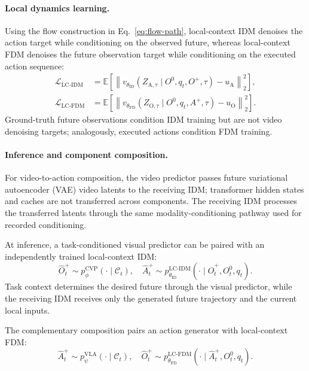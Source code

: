 \paragraph{Local dynamics learning.}
Using the flow construction in Eq.~\ref{eq:flow-path}, local-context IDM denoises
the action target while conditioning on the observed future, whereas local-context
FDM denoises the future observation target while conditioning on the
executed action sequence:
\begin{equation}
\begin{aligned}
\mathcal L_{\mathrm{LC\text{-}IDM}}
&=
\mathbb E\!\left[
\left\|
v_{\theta_{\mathrm{ID}}}
(
Z_{\mathrm A,\tau}
\mid
 O^0,q_t, O^+,\tau
)
-u_{\mathrm A}
\right\|_2^2
\right],\\
\mathcal L_{\mathrm{LC\text{-}FDM}}
&=
\mathbb E\!\left[
\left\|
v_{\theta_{\mathrm{FD}}}
(
Z_{\mathrm O,\tau}
\mid
 O^0,q_t, A^+,\tau
)
-u_{\mathrm O}
\right\|_2^2
\right].
\end{aligned}
\label{eq:strict-dynamics-objectives}
\end{equation}
Ground-truth future observations condition IDM training but are not video
denoising targets; analogously, executed actions condition FDM training.

\paragraph{Inference and component composition.}

For video-to-action composition, the video predictor passes future
variational autoencoder (VAE) video latents to the receiving IDM;
transformer hidden states and caches are not transferred across components.
The receiving IDM processes the transferred latents through the same
modality-conditioning pathway used for recorded conditioning.

At inference, a task-conditioned visual predictor can be paired with an
independently trained local-context IDM:
\begin{equation}
\hat{O}_t^+ \sim p_\phi^{\mathrm{CVP}}(\cdot\mid\mathcal C_t),
\quad
\hat{A}_t^+ \sim p_{\theta_{\mathrm{ID}}}^{\mathrm{LC\text{-}IDM}}
(\cdot\mid \hat{O}_t^+, O_t^0, q_t).
\label{eq:strict-vta-composition}
\end{equation}
Task context determines the desired future through the visual predictor,
while the receiving IDM receives only the generated future trajectory and the
current local inputs.

The complementary composition pairs an action generator with local-context FDM:
\begin{equation}
\hat{A}_t^+ \sim p_\psi^{\mathrm{VLA}}(\cdot\mid\mathcal C_t),
\quad
\hat{O}_t^+ \sim p_{\theta_{\mathrm{FD}}}^{\mathrm{LC\text{-}FDM}}
(\cdot\mid \hat{A}_t^+, O_t^0, q_t).
\label{eq:strict-atv-composition}
\end{equation}

